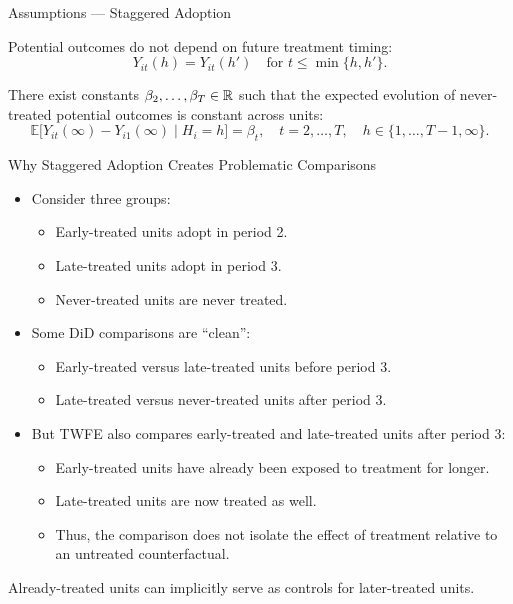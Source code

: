 \documentclass[11pt,aspectratio=169]{beamer}
\newcommand{\E}{\mathbb{E}}
\begin{document}
\begin{frame}{Assumptions --- Staggered Adoption}
\begin{definitionbox}
Potential outcomes do not depend on future treatment timing:
\[Y_{it}(h)=Y_{it}(h')\quad\text{for } t\le\min\{h,h'\}.\]
\end{definitionbox}
\begin{definitionbox}
There exist constants $\beta_2,\dots,\beta_T\in\mathbb{R}$ such that the expected evolution of never-treated potential outcomes is constant across units:
\[\E\bigl[Y_{it}(\infty)-Y_{i1}(\infty)\mid H_i=h\bigr]=\beta_t,\quad t=2,\dots,T,\quad h\in\{1,\dots,T-1,\infty\}.\]
\end{definitionbox}
\end{frame}

\begin{frame}{Why Staggered Adoption Creates Problematic Comparisons}
\footnotesize
\begin{itemize}
  \item Consider three groups:
  \begin{itemize}
    \item Early-treated units adopt in period 2.
    \item Late-treated units adopt in period 3.
    \item Never-treated units are never treated.
  \end{itemize}
  \item Some DiD comparisons are ``clean'':
  \begin{itemize}
    \item Early-treated versus late-treated units before period 3.
    \item Late-treated versus never-treated units after period 3.
  \end{itemize}
  \item But TWFE also compares early-treated and late-treated units after period 3:
  \begin{itemize}
    \item Early-treated units have already been exposed to treatment for longer.
    \item Late-treated units are now treated as well.
    \item Thus, the comparison does not isolate the effect of treatment relative to an untreated counterfactual.
  \end{itemize}
\end{itemize}
\begin{warningbox}
Already-treated units can implicitly serve as controls for later-treated units.
\end{warningbox}
\end{frame}
\end{document}
